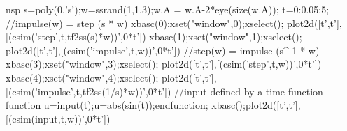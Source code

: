 \begin{examples}
  \begin{mintednsp}{nsp}
    s=poly(0,'s');w=ssrand(1,1,3);w.A = w.A-2*eye(size(w.A));
    t=0:0.05:5;
    //impulse(w) = step (s * w)
    xbasc(0);xset("window",0);xselect();
    plot2d([t',t'],[(csim('step',t,tf2ss(s)*w))',0*t'])
    xbasc(1);xset("window",1);xselect();
    plot2d([t',t'],[(csim('impulse',t,w))',0*t'])
    //step(w) = impulse (s^-1 * w)
    xbasc(3);xset("window",3);xselect();
    plot2d([t',t'],[(csim('step',t,w))',0*t'])
    xbasc(4);xset("window",4);xselect();
    plot2d([t',t'],[(csim('impulse',t,tf2ss(1/s)*w))',0*t'])
    //input defined by a time function
    function u=input(t);u=abs(sin(t));endfunction;
    xbasc();plot2d([t',t'],[(csim(input,t,w))',0*t'])
  \end{mintednsp}
\end{examples}
\begin{manseealso}
          
\end{manseealso}
